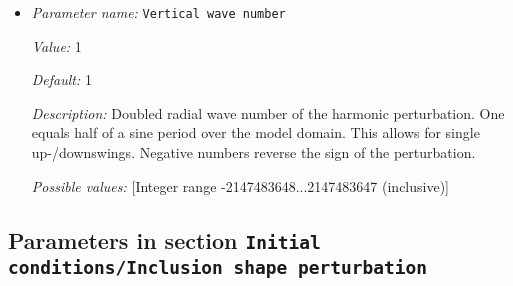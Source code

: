 \begin{itemize}
{\it Value:} 1600.0


{\it Default:} 1600.0


{\it Description:} The reference temperature that is perturbed by theharmonic function. Only used in incompressible models.


{\it Possible values:} [Double 0...1.79769e+308 (inclusive)]
\item {\it Parameter name:} {\tt Vertical wave number}
\label{parameters:Initial conditions/Harmonic perturbation/Vertical wave number}


{\it Value:} 1


{\it Default:} 1


{\it Description:} Doubled radial wave number of the harmonic perturbation.  One equals half of a sine period over the model domain.  This allows for single up-/downswings. Negative numbers  reverse the sign of the perturbation.


{\it Possible values:} [Integer range -2147483648...2147483647 (inclusive)]
\end{itemize}

\subsection{Parameters in section \tt Initial conditions/Inclusion shape perturbation}
\label{parameters:Initial_20conditions/Inclusion_20shape_20perturbation}

